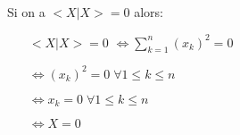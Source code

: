 \documentclass{article}
\begin{document}
\begin{itemize}
\begin{center}
\begin{minipage}{0.50\textwidth}
\begin{itemize}
            \end{itemize}
        \end{minipage}
    \end{center}
    Si on a $<X | X> = 0$ alors:
    \begin{center}
        \begin{minipage}{0.50\textwidth}    
            \begin{itemize}
                \item[$<X | X> = 0$] $\Leftrightarrow \sum_{k=1}^n (x_k)^2 = 0$
                \item[] $\Leftrightarrow (x_k)^2 = 0 \; \forall 1 \leq k \leq n$
                \item[] $\Leftrightarrow x_k = 0 \; \forall 1 \leq k \leq n$
                \item[] $\Leftrightarrow X = 0$   
            \end{itemize}
        \end{minipage}
    \end{center}
\end{itemize}

\newpage
\end{document}
